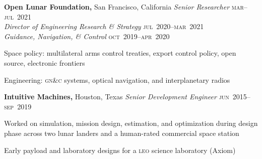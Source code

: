 \documentclass[12pt,letterpaper]{article}
\newenvironment{itemize*}%
{\begin{itemize}%
  \setlength{\itemsep}{0pt}}%
{\end{itemize}}
\newcommand{\rdate}[1]{{\hfill #1}}
\begin{document}
\medskip
\textbf{Open Lunar Foundation,} San Francisco, California \newline
\emph{Senior Researcher} \rdate{\textsc{mar}--\textsc{jul}~2021} \\
\emph{Director of Engineering Research \& Strategy} \rdate{\textsc{jul}~2020--\textsc{mar}~2021} \\
\emph{Guidance, Navigation, \& Control} \rdate{\textsc{oct}~2019--\textsc{apr}~2020}
\begin{itemize*}
  \item Space policy: multilateral arms control treaties, export control policy, open source, electronic frontiers
  \item Engineering: \textsc{gn\&c} systems, optical navigation, and interplanetary radios
\end{itemize*}

\medskip
\textbf{Intuitive Machines,} Houston, Texas \newline
\emph{Senior Development Engineer} \rdate{\textsc{jun}~2015--\textsc{sep}~2019} %
\begin{itemize*}
  \item Worked on simulation, mission design, estimation, and optimization during design phase across two lunar landers and a human-rated commercial space station
  \item Early payload and laboratory designs for a \textsc{leo} science laboratory (Axiom)
\end{itemize*}
\end{document}
